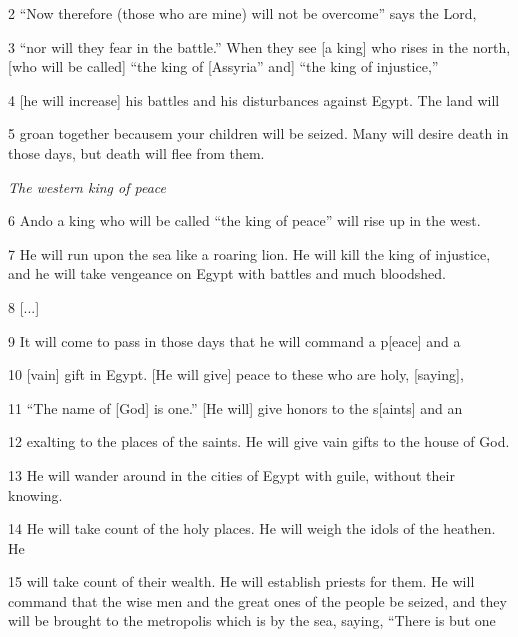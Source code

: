 \par 2 “Now therefore (those who are mine) will not be overcome” says the Lord,

\par 3 “nor will they fear in the battle.” When they see [a king] who rises in the north, [who will be called] “the king of [Assyria” and] “the king of injustice,”

\par 4 [he will increase] his battles and his disturbances against Egypt. The land will

\par 5 groan together becausem your children will be seized. Many will desire death in those days, but death will flee from them.

\par \textit{The western king of peace}

\par 6 Ando a king who will be called “the king of peace” will rise up in the west.

\par 7 He will run upon the sea like a roaring lion. He will kill the king of injustice, and he will take vengeance on Egypt with battles and much bloodshed.

\par 8 [...]

\par 9 It will come to pass in those days that he will command a p[eace] and a

\par 10 [vain] gift in Egypt. [He will give] peace to these who are holy, [saying],

\par 11 “The name of [God] is one.” [He will] give honors to the s[aints] and an

\par 12 exalting to the places of the saints. He will give vain gifts to the house of God.

\par 13 He will wander around in the cities of Egypt with guile, without their knowing.

\par 14 He will take count of the holy places. He will weigh the idols of the heathen. He

\par 15 will take count of their wealth. He will establish priests for them. He will command that the wise men and the great ones of the people be seized, and they will be brought to the metropolis which is by the sea, saying, “There is but one

